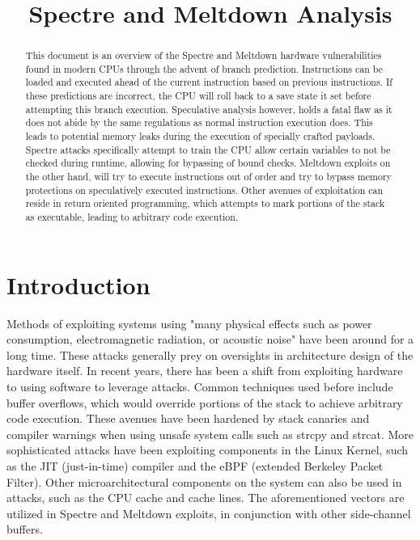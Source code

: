 \documentclass[conference]{IEEEtran}
\begin{document}
\title{Spectre and Meltdown Analysis}

\author{
}

\maketitle

\begin{abstract}
This document is an overview of the Spectre and Meltdown hardware vulnerabilities found in modern CPUs through the advent of branch prediction.
Instructions can be loaded and executed ahead of the current instruction based on previous instructions.
If these predictions are incorrect, the CPU will roll back to a save state it set before attempting this branch execution.
Speculative analysis however, holds a fatal flaw as it does not abide by the same regulations as normal instruction execution does.
This leads to potential memory leaks during the execution of specially crafted payloads.
Spectre attacks specifically attempt to train the CPU allow certain variables to not be checked during runtime, allowing for bypassing of bound checks.
Meltdown exploits on the other hand, will try to execute instructions out of order and try to bypass memory protections on speculatively executed instructions.
Other avenues of exploitation can reside in return oriented programming, which attempts to mark portions of the stack as executable, leading to arbitrary code execution.
\end{abstract}

\section{Introduction}

Methods of exploiting systems using "many physical effects such as power consumption, electromagnetic radiation, or acoustic noise" \autocite[1]{SpectreAttacksExploiting} have been around for a long time.
These attacks generally prey on oversights in architecture design of the hardware itself.
In recent years, there has been a shift from exploiting hardware to using software to leverage attacks.
Common techniques used before include buffer overflows, which would override portions of the stack to achieve arbitrary code execution.
These avenues have been hardened by stack canaries and compiler warnings when using unsafe system calls such as strcpy and strcat.
More sophisticated attacks have been exploiting components in the Linux Kernel, such as the JIT (just-in-time) compiler and the eBPF  (extended Berkeley Packet Filter).
Other microarchitectural components on the system can also be used in attacks, such as the CPU cache and cache lines.
The aforementioned vectors are utilized in Spectre and Meltdown exploits, in conjunction with other side-channel buffers.
\end{document}
